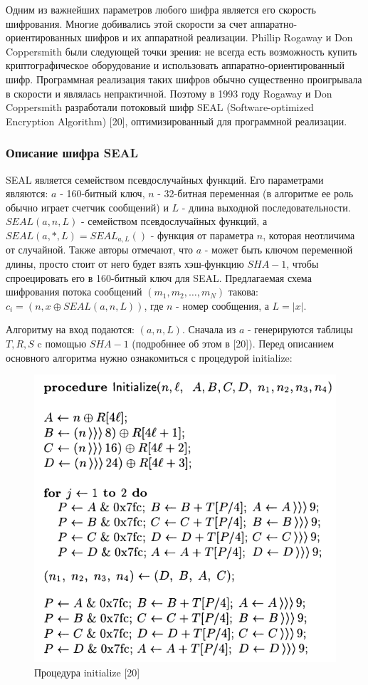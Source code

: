 \documentclass[colorthm]{./civarticle}
\begin{document}
Одним из важнейших параметров любого шифра является его скорость шифрования. Многие добивались этой скорости за счет аппаратно-ориентированных шифров и их аппаратной реализации. Phillip Rogaway и Don Coppersmith были следующей точки зрения: не всегда есть возможность купить криптографическое оборудование и использовать аппаратно-ориентированный шифр. Программная реализация таких шифров обычно существенно проигрывала в скорости и являлась непрактичной. Поэтому в 1993 году Rogaway и Don Coppersmith разработали потоковый шифр SEAL (Software-optimized Encryption Algorithm) [20], оптимизированный для программной реализации.

\subsubsection{Описание шифра SEAL}

SEAL является семейством псевдослучайных функций. Его параметрами являются: $a$ - 160-битный ключ, $n$ - 32-битная переменная (в алгоритме ее роль обычно играет счетчик сообщений) и $L$ - длина выходной последовательности. $SEAL(a, n, L)$ - семейством псевдослучайных функций, а $SEAL(a, *, L) = SEAL_{a, L}()$ - функция от параметра $n$, которая неотличима от случайной. Также авторы отмечают, что $a$ - может быть ключом переменной длины, просто стоит от него будет взять хэш-функцию $SHA-1$, чтобы спроецировать его в 160-битный ключ для SEAL. Предлагаемая схема шифрования потока сообщений $(m_1, m_2, \dots, m_N)$ такова: $c_i = (n, x \oplus SEAL(a, n, L))$, где $n$ - номер сообщения, а $L=|x|$.

Алгоритму на вход подаются: $(a, n, L)$. Сначала из $a$ - генерируются таблицы $T, R, S$ c помощью $SHA-1$ (подробннее об этом в [20]). Перед описанием основного алгоритма нужно ознакомиться с процедурой initialize:

\begin{figure}[H]
    \centering
    \includegraphics[width=0.5\linewidth]{init.png}
    \caption{Процедура initialize [20]}
    \label{fig:enter-label}
\end{figure}
\end{document}
